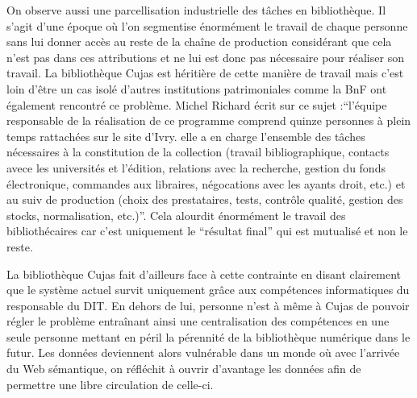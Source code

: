 On observe aussi une parcellisation industrielle des tâches en bibliothèque. Il s'agit d'une époque où l'on segmentise énormément le travail de chaque personne sans lui donner accès au reste de la chaîne de production considérant que cela n'est pas dans ces attributions et ne lui est donc pas nécessaire pour réaliser son travail. La bibliothèque Cujas est héritière de cette manière de travail mais c'est loin d'être un cas isolé d'autres institutions patrimoniales comme la BnF ont également rencontré ce problème. Michel Richard écrit sur ce sujet :\enquote{l'équipe responsable de la réalisation de ce programme comprend quinze personnes à plein temps rattachées sur le site d'Ivry. elle a en charge l'ensemble des tâches nécessaires à la constitution de la collection (travail bibliographique, contacts avece les universités et l'édition, relations avec la recherche, gestion du fonds électronique, commandes aux libraires, négocations avec les ayants droit, etc.) et au suiv de production (choix des prestataires, tests, contrôle qualité, gestion des stocks, normalisation, etc.)}. Cela alourdit énormément le travail des bibliothécaires car c'est uniquement le \enquote{résultat final} qui est mutualisé et non le reste.  

La bibliothèque Cujas fait d'ailleurs face à cette contrainte en disant clairement que le système actuel survit uniquement grâce aux compétences informatiques du responsable du DIT. En dehors de lui, personne n'est à même à Cujas de pouvoir régler le problème entraînant ainsi une centralisation des compétences en une seule personne mettant en péril la pérennité de la bibliothèque numérique dans le futur. Les données deviennent alors vulnérable dans un monde où avec l'arrivée du Web sémantique, on réfléchit à ouvrir d'avantage les données afin de permettre une libre circulation de celle-ci.